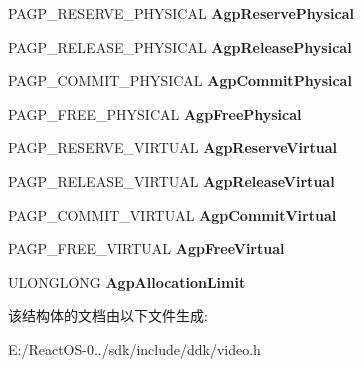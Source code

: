 \begin{DoxyCompactItemize}
P\+A\+G\+P\+\_\+\+R\+E\+S\+E\+R\+V\+E\+\_\+\+P\+H\+Y\+S\+I\+C\+AL {\bfseries Agp\+Reserve\+Physical}
\item 
\mbox{\label{struct___v_i_d_e_o___p_o_r_t___a_g_p___i_n_t_e_r_f_a_c_e_ac2acd3f08b5b4224f29aae07fab96c32}} 
P\+A\+G\+P\+\_\+\+R\+E\+L\+E\+A\+S\+E\+\_\+\+P\+H\+Y\+S\+I\+C\+AL {\bfseries Agp\+Release\+Physical}
\item 
\mbox{\label{struct___v_i_d_e_o___p_o_r_t___a_g_p___i_n_t_e_r_f_a_c_e_a0fad6d6491825ec856abd38ac3ca4d2c}} 
P\+A\+G\+P\+\_\+\+C\+O\+M\+M\+I\+T\+\_\+\+P\+H\+Y\+S\+I\+C\+AL {\bfseries Agp\+Commit\+Physical}
\item 
\mbox{\label{struct___v_i_d_e_o___p_o_r_t___a_g_p___i_n_t_e_r_f_a_c_e_aa24481f9d8bda15824049904095ebb17}} 
P\+A\+G\+P\+\_\+\+F\+R\+E\+E\+\_\+\+P\+H\+Y\+S\+I\+C\+AL {\bfseries Agp\+Free\+Physical}
\item 
\mbox{\label{struct___v_i_d_e_o___p_o_r_t___a_g_p___i_n_t_e_r_f_a_c_e_a29ae2ce6ab5893c43ed0318db59ed903}} 
P\+A\+G\+P\+\_\+\+R\+E\+S\+E\+R\+V\+E\+\_\+\+V\+I\+R\+T\+U\+AL {\bfseries Agp\+Reserve\+Virtual}
\item 
\mbox{\label{struct___v_i_d_e_o___p_o_r_t___a_g_p___i_n_t_e_r_f_a_c_e_ac2be458a7f6553a316d7dc8d7078b773}} 
P\+A\+G\+P\+\_\+\+R\+E\+L\+E\+A\+S\+E\+\_\+\+V\+I\+R\+T\+U\+AL {\bfseries Agp\+Release\+Virtual}
\item 
\mbox{\label{struct___v_i_d_e_o___p_o_r_t___a_g_p___i_n_t_e_r_f_a_c_e_acf737cfb402cb5aeba152a81d9251a72}} 
P\+A\+G\+P\+\_\+\+C\+O\+M\+M\+I\+T\+\_\+\+V\+I\+R\+T\+U\+AL {\bfseries Agp\+Commit\+Virtual}
\item 
\mbox{\label{struct___v_i_d_e_o___p_o_r_t___a_g_p___i_n_t_e_r_f_a_c_e_a5cd6dafa6e39c8a4f8e279149b8ab10a}} 
P\+A\+G\+P\+\_\+\+F\+R\+E\+E\+\_\+\+V\+I\+R\+T\+U\+AL {\bfseries Agp\+Free\+Virtual}
\item 
\mbox{\label{struct___v_i_d_e_o___p_o_r_t___a_g_p___i_n_t_e_r_f_a_c_e_af0c037f17632401abc9220e8120f4013}} 
U\+L\+O\+N\+G\+L\+O\+NG {\bfseries Agp\+Allocation\+Limit}
\end{DoxyCompactItemize}


该结构体的文档由以下文件生成\+:\begin{DoxyCompactItemize}
\item 
E\+:/\+React\+O\+S-\/0../sdk/include/ddk/video.\+h\end{DoxyCompactItemize}
